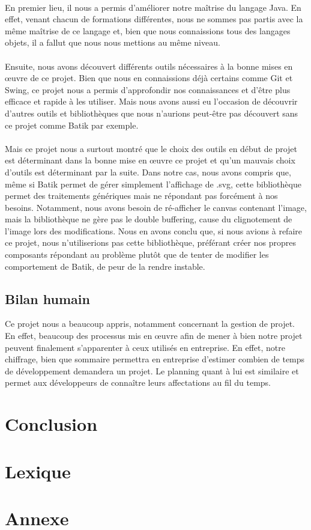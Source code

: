 \documentclass[a4paper,11pt]{article}
\begin{document}
\paragraph{} En premier lieu, il nous a permis d'améliorer notre maîtrise du langage Java. En effet, venant chacun de formations différentes, nous ne sommes pas partis avec la même maîtrise de ce langage et, bien que nous connaissions tous des langages objets, il a fallut que nous nous mettions au même niveau.

\paragraph{} Ensuite, nous avons découvert différents outils nécessaires à la bonne mises en œuvre de ce projet. Bien que nous en connaissions déjà certains comme Git et Swing, ce projet nous a permis d'approfondir nos connaissances et d'être plus efficace et rapide à les utiliser. Mais nous avons aussi eu l'occasion de découvrir d'autres outils et bibliothèques que nous n'aurions peut-être pas découvert sans ce projet comme Batik par exemple.

\paragraph{} Mais ce projet nous a surtout montré que le choix des outils en début de projet est déterminant dans la bonne mise en œuvre ce projet et qu'un mauvais choix d'outils est déterminant par la suite. Dans notre cas, nous avons compris que, même si Batik permet de gérer simplement l'affichage de .svg, cette bibliothèque permet des traitements génériques mais ne répondant pas forcément à nos besoins. Notamment, nous avons besoin de ré-afficher le canvas contenant l'image, mais la bibliothèque ne gère pas le double buffering, cause du clignotement de l'image lors des modifications. Nous en avons conclu que, si nous avions à refaire ce projet, nous n'utiliserions pas cette bibliothèque, préférant créer nos propres composants répondant au problème plutôt que de tenter de modifier les comportement de Batik, de peur de la rendre instable.

\subsection{Bilan humain}
Ce projet nous a beaucoup appris, notamment concernant la gestion de projet. En effet, beaucoup des processus mis en œuvre afin de mener à bien notre projet peuvent finalement s'apparenter à ceux utilisés en entreprise. En effet, notre chiffrage, bien que sommaire permettra en entreprise d'estimer combien de temps de développement demandera un projet. Le planning quant à lui est similaire et permet aux développeurs de connaître leurs affectations au fil du temps.

\section*{Conclusion}

\section*{Lexique}

\section*{Annexe}
\end{document}
